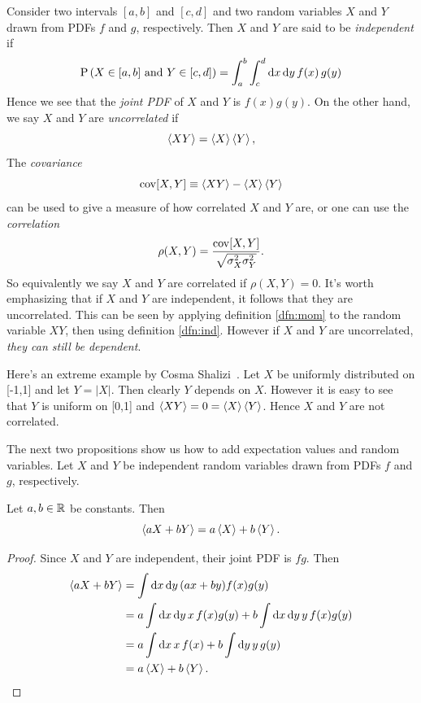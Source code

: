 Consider two intervals $[a,b]$ and $[c,d]$ and two random variables
$X$ and $Y$ drawn from PDFs $f$ and $g$, respectively. Then $X$ and $Y$ are
said to be {\it independent} if
\begin{equation}\label{dfn:ind}
  \operatorname{P}\left(X\in[a,b]\text{ and }Y\in[c,d]\right)=\int_a^b\int_c^d\dd{x}\dd{y}f(x)\,g(y)
\end{equation}
Hence we see that the {\it joint PDF} of $X$ and $Y$
is $f(x)g(y)$. On the other hand, we say $X$ and $Y$ are {\it uncorrelated}
 if
\begin{equation}
  \ev{XY}=\ev{X}\ev{Y},
\end{equation}
The {\it covariance}
\begin{equation}\label{dfn:cov}
  \Cov[X,Y]\equiv\ev{XY}-\ev{X}\ev{Y}
\end{equation}
can be used to give a measure of how correlated $X$ and $Y$ are, or
one can use the {\it correlation}
\begin{equation}\label{dfn:cor}
  \rho(X,Y)=\frac{\operatorname{cov}[X,Y]}{\sqrt{\sigma^2_X\sigma^2_Y}}.
\end{equation}
So equivalently we say $X$ and $Y$ are correlated if $\rho(X,Y)=0$.
It's worth emphasizing that if $X$ and $Y$ are independent,
it follows that they are uncorrelated. This can be seen by applying
definition \eqref{dfn:mom} to the random variable $XY$, then using
definition \eqref{dfn:ind}. However if $X$ and $Y$ are
uncorrelated, {\it they can still be dependent}.
\begin{example*}{}{}
  Here's an extreme example by Cosma Shalizi~\cite{cosma_indep}.
Let $X$ be uniformly distributed
  on [-1,1] and let $Y=|X|$. Then clearly $Y$ depends on $X$. However it
  is easy to see that $Y$ is uniform on [0,1] and $\ev{XY}=0=\ev{X}\ev{Y}$.
  Hence $X$ and $Y$ are not correlated.
\end{example*}

The next two propositions show us how to add expectation values and
random variables. Let $X$ and $Y$ be independent random variables
drawn from PDFs $f$ and $g$, respectively.
\begin{proposition}{}{}
  Let $a,b\in\mathbb{R}$ be constants. Then
  $$\ev{aX+bY}=a\ev{X}+b\ev{Y}.$$
  \begin{proof}
    Since $X$ and $Y$ are independent, their joint PDF is $fg$. Then
    \begin{equation*}
      \begin{aligned} 
      \ev{aX+bY}&=\int\dd{x}\dd{y}(ax+by)f(x)g(y)\\
                &=a\int\dd{x}\dd{y}x\,f(x)g(y)+
                 b\int\dd{x}\dd{y}y\,f(x)g(y)\\
                &=a\int\dd{x}x\,f(x)+b\int\dd{y}y\,g(y)\\
                &=a\ev{X}+b\ev{Y}.
      \end{aligned}
    \end{equation*}
  \end{proof}
\end{proposition}

